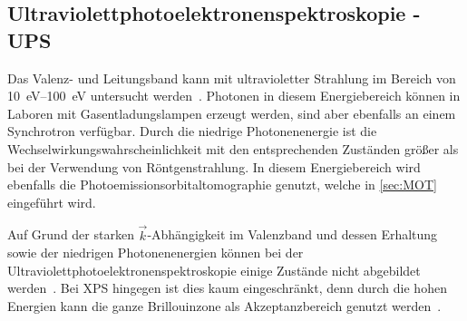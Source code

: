         

        \subsection{Ultraviolettphotoelektronenspektroskopie - UPS} \label{sec:UPS}
            Das Valenz- und Leitungsband kann mit ultravioletter Strahlung im Bereich von \SIrange{10}{100}{\electronvolt} untersucht werden~\cite{Fauster}.
            Photonen in diesem Energiebereich können in Laboren mit Gasentladungslampen erzeugt werden, sind aber ebenfalls an einem Synchrotron verfügbar.
            Durch die niedrige Photonenenergie ist die Wechselwirkungswahrscheinlichkeit mit den entsprechenden Zuständen größer als bei der Verwendung von Röntgenstrahlung.
            In diesem Energiebereich wird ebenfalls die Photoemissionsorbitaltomographie genutzt, welche in \autoref{sec:MOT} eingeführt wird.

            Auf Grund der starken $\vec{k}$-Abhängigkeit im Valenzband und dessen Erhaltung sowie der niedrigen Photonenenergien können bei der Ultraviolettphotoelektronenspektroskopie einige Zustände nicht abgebildet werden~\cite{Hüfner}.
            Bei XPS hingegen ist dies kaum eingeschränkt, denn durch die hohen Energien kann die ganze Brillouinzone als Akzeptanzbereich genutzt werden~\cite{Hüfner}.

